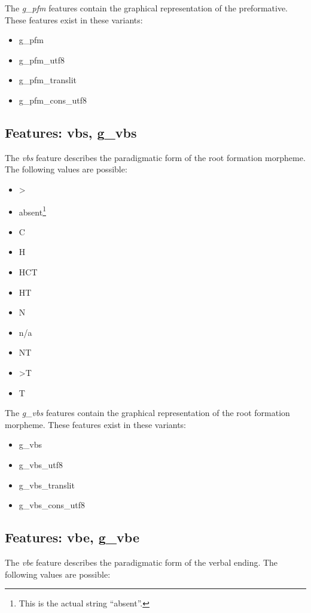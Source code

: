 \documentclass[11pt,oneside,a4paper]{memoir}
\begin{document}
The \emph{g\_pfm} features contain the graphical representation of the preformative. These
features exist in these variants:

\begin{itemize}
\item g\_pfm
\item g\_pfm\_utf8
\item g\_pfm\_translit
\item g\_pfm\_cons\_utf8
\end{itemize}


\subsection{Features: vbs, g\_vbs}

The \emph{vbs} feature describes the paradigmatic form of the root formation morpheme. The following
values are possible:

\begin{itemize}
\item >
\item absent\footnote{This is the actual string ``absent''.}
\item C
\item H
\item HCT
\item HT
\item N
\item n/a
\item NT
\item >T
\item T
\end{itemize}

The \emph{g\_vbs} features contain the graphical representation of the root formation morpheme.
These features exist in these variants:

\begin{itemize}
\item g\_vbs
\item g\_vbs\_utf8
\item g\_vbs\_translit
\item g\_vbs\_cons\_utf8
\end{itemize}


\subsection{Features: vbe, g\_vbe}

The \emph{vbe} feature describes the paradigmatic form of the verbal ending. The following
values are possible:
\end{document}
